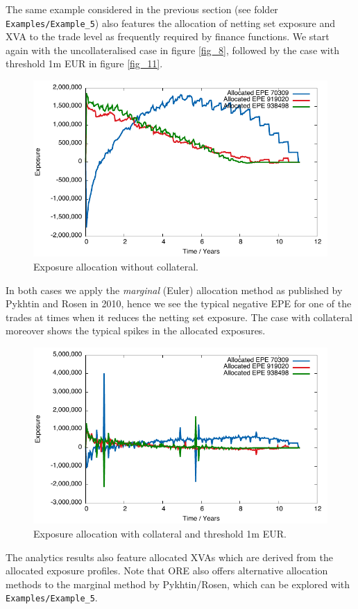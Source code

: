 \documentclass[12pt, a4paper]{article}
\begin{document}
The same example considered in the previous section (see folder {\tt Examples/Example\_5}) also features the allocation of netting set exposure and XVA to the trade level as frequently required by finance functions.  We start again with the uncollateralised case in figure \ref{fig_8}, followed by the case with threshold 1m EUR in figure \ref{fig_11}.
\begin{figure}[hbt]
\begin{center}
\includegraphics[scale=1.0]{example_nocollateral_allocated_epe.pdf}
\end{center}
\caption{Exposure allocation without collateral.}
\label{fig_12}
\end{figure}
In both cases we apply the {\em marginal} (Euler) allocation method as published by Pykhtin and Rosen in 2010, hence we see the typical negative EPE for one of the trades at times when it reduces the netting set exposure. The case with collateral moreover shows the typical spikes in the allocated exposures.
\begin{figure}[hbt]
\begin{center}
\includegraphics[scale=1.0]{example_threshold_allocated_epe.pdf}
\end{center}
\caption{Exposure allocation with collateral and threshold 1m EUR.}
\label{fig_13}
\end{figure}
The analytics results also feature allocated XVAs which are derived from the allocated exposure profiles. Note that ORE also offers alternative allocation methods to the marginal method by Pykhtin/Rosen, which can be explored with {\tt Examples/Example\_5}.
\end{document}
